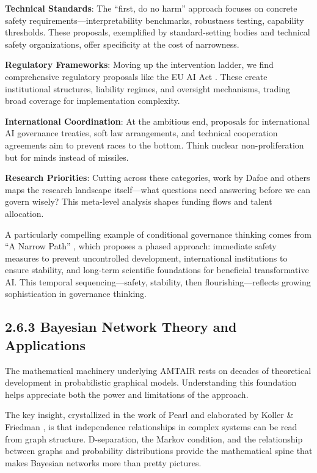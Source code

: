 \documentclass[
  11pt,
  letterpaper,
]{book}
\begin{document}
\textbf{Technical Standards}: The ``first, do no harm'' approach focuses
on concrete safety requirements---interpretability benchmarks,
robustness testing, capability thresholds. These proposals, exemplified
by standard-setting bodies and technical safety organizations, offer
specificity at the cost of narrowness.

\textbf{Regulatory Frameworks}: Moving up the intervention ladder, we
find comprehensive regulatory proposals like the EU AI Act
\textcite{european2024}. These create institutional structures,
liability regimes, and oversight mechanisms, trading broad coverage for
implementation complexity.

\textbf{International Coordination}: At the ambitious end, proposals for
international AI governance treaties, soft law arrangements, and
technical cooperation agreements aim to prevent races to the bottom.
Think nuclear non-proliferation but for minds instead of missiles.

\textbf{Research Priorities}: Cutting across these categories, work by
Dafoe \textcite{dafoe2018} and others maps the research landscape
itself---what questions need answering before we can govern wisely? This
meta-level analysis shapes funding flows and talent allocation.

A particularly compelling example of conditional governance thinking
comes from ``A Narrow Path'' \textcite{miotti2024}, which proposes a
phased approach: immediate safety measures to prevent uncontrolled
development, international institutions to ensure stability, and
long-term scientific foundations for beneficial transformative AI. This
temporal sequencing---safety, stability, then flourishing---reflects
growing sophistication in governance thinking.

\subsection{2.6.3 Bayesian Network Theory and
Applications}\label{sec-bn-theory}

The mathematical machinery underlying AMTAIR rests on decades of
theoretical development in probabilistic graphical models. Understanding
this foundation helps appreciate both the power and limitations of the
approach.

The key insight, crystallized in the work of Pearl \textcite{pearl2014}
and elaborated by Koller \& Friedman \textcite{koller2009}, is that
independence relationships in complex systems can be read from graph
structure. D-separation, the Markov condition, and the relationship
between graphs and probability distributions provide the mathematical
spine that makes Bayesian networks more than pretty pictures.
\end{document}
